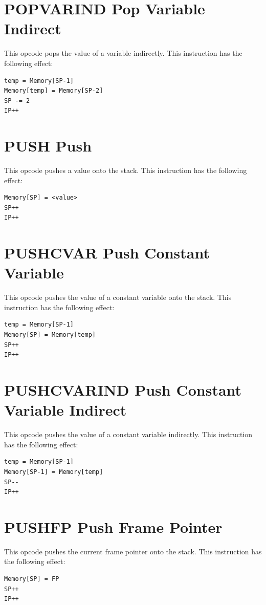 \documentclass[11pt,a4paper,oneside]{book}
\begin{document}
\pagebreak
\section[POPVARIND]{\texorpdfstring{POPVARIND \hfill Pop Variable Indirect}{POPVARIND -- Pop Variable Indirect}}
This opcode pops the value of a variable indirectly. This instruction has the following effect:
\begin{verbatim}
temp = Memory[SP-1]
Memory[temp] = Memory[SP-2]
SP -= 2
IP++
\end{verbatim}

\pagebreak
\section[PUSH]{\texorpdfstring{PUSH \hfill Push}{PUSH -- Push}}
This opcode pushes a value onto the stack. This instruction has the following effect:
\begin{verbatim}
Memory[SP] = <value>
SP++
IP++
\end{verbatim}

\pagebreak
\section[PUSHCVAR]{\texorpdfstring{PUSHCVAR \hfill Push Constant Variable}{PUSHCVAR -- Push Constant Variable}}
This opcode pushes the value of a constant variable onto the stack. This instruction has the following effect:
\begin{verbatim}
temp = Memory[SP-1]
Memory[SP] = Memory[temp]
SP++
IP++
\end{verbatim}

\pagebreak
\section[PUSHCVARIND]{\texorpdfstring{PUSHCVARIND \hfill Push Constant Variable Indirect}{PUSHCVARIND -- Push Constant Variable Indirect}}
This opcode pushes the value of a constant variable indirectly. This instruction has the following effect:
\begin{verbatim}
temp = Memory[SP-1]
Memory[SP-1] = Memory[temp]
SP--
IP++
\end{verbatim}

\pagebreak
\section[PUSHFP]{\texorpdfstring{PUSHFP \hfill Push Frame Pointer}{PUSHFP -- Push Frame Pointer}}
This opcode pushes the current frame pointer onto the stack. This instruction has the following effect:
\begin{verbatim}
Memory[SP] = FP
SP++
IP++
\end{verbatim}
\end{document}
